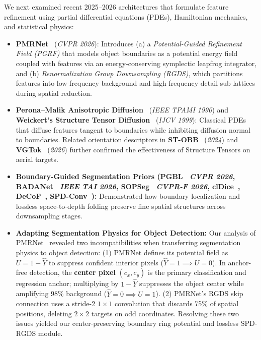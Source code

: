 \documentclass[11pt,a4paper]{article}
\begin{document}
We next examined recent 2025--2026 architectures that formulate feature refinement using partial differential equations (PDEs), Hamiltonian mechanics, and statistical physics:
\begin{itemize}[leftmargin=1.5em]
    \item \textbf{PMRNet}~\cite{kang2026pmrnet} (\emph{CVPR 2026}): Introduces (a) a \emph{Potential-Guided Refinement Field (PGRF)} that models object boundaries as a potential energy field coupled with features via an energy-conserving symplectic leapfrog integrator, and (b) \emph{Renormalization Group Downsampling (RGDS)}, which partitions features into low-frequency background and high-frequency detail sub-lattices during spatial reduction.
    \item \textbf{Perona--Malik Anisotropic Diffusion}~\cite{perona1990anisotropic} (\emph{IEEE TPAMI 1990}) and \textbf{Weickert's Structure Tensor Diffusion}~\cite{weickert1999coherence} (\emph{IJCV 1999}): Classical PDEs that diffuse features tangent to boundaries while inhibiting diffusion normal to boundaries. Related orientation descriptors in \textbf{ST-OBB}~\cite{yang2024stobb} (\emph{2024}) and \textbf{VGTok}~\cite{lin2026vgtok} (\emph{2026}) further confirmed the effectiveness of Structure Tensors on aerial targets.
    \item \textbf{Boundary-Guided Segmentation Priors (PGBL~\cite{liao2026pgbl} \emph{CVPR 2026}, BADANet~\cite{shang2026badanet} \emph{IEEE TAI 2026}, SOPSeg~\cite{wang2026sopseg} \emph{CVPR-F 2026}, clDice~\cite{shit2021cldice}, DeCoF~\cite{liu2025decof}, SPD-Conv~\cite{sunkara2022spd}):} Demonstrated how boundary localization and lossless space-to-depth folding preserve fine spatial structures across downsampling stages.
    \item \textbf{Adapting Segmentation Physics for Object Detection:} Our analysis of PMRNet~\cite{kang2026pmrnet} revealed two incompatibilities when transferring segmentation physics to object detection: (1) PMRNet defines its potential field as $U = 1 - \hat{Y}$ to suppress confident interior pixels ($\hat{Y}=1 \implies U=0$). In anchor-free detection, the \textbf{center pixel} $(c_x, c_y)$ is the primary classification and regression anchor; multiplying by $1-\hat{Y}$ suppresses the object center while amplifying 98\% background ($\hat{Y}=0 \implies U=1$). (2) PMRNet's RGDS skip connection uses a stride-2 $1\times 1$ convolution that discards 75\% of spatial positions, deleting $2\times 2$ targets on odd coordinates. Resolving these two issues yielded our center-preserving boundary ring potential and lossless SPD-RGDS module.
\end{itemize}
\end{document}
